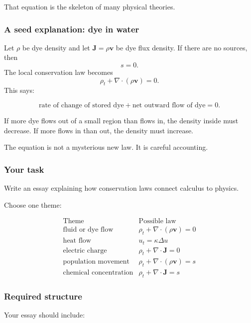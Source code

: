 That equation is the skeleton of many physical theories.

\subsubsection*{A seed explanation: dye in water}

Let \(\rho\) be dye density and let \(\mathbf J=\rho\mathbf v\) be dye flux density.
If there are no sources, then
\[
    s=0.
\]
The local conservation law becomes
\[
\boxed{
    \rho_t+\nabla\cdot(\rho\mathbf v)=0.
}
\]
This says:

\[
\text{rate of change of stored dye}
+
\text{net outward flow of dye}
=
0.
\]

If more dye flows out of a small region than flows in, the density inside must decrease.
If more flows in than out, the density must increase.

The equation is not a mysterious new law.  It is careful accounting.

\subsubsection*{Your task}

Write an essay explaining how conservation laws connect calculus to physics.

Choose one theme:

\[
\begin{array}{c|c}
\text{Theme} & \text{Possible law} \\ \hline
\text{fluid or dye flow} & \rho_t+\nabla\cdot(\rho\mathbf v)=0\\[1mm]
\text{heat flow} & u_t=\kappa\Delta u\\[1mm]
\text{electric charge} & \rho_t+\nabla\cdot\mathbf J=0\\[1mm]
\text{population movement} & \rho_t+\nabla\cdot(\rho\mathbf v)=s\\[1mm]
\text{chemical concentration} & \rho_t+\nabla\cdot\mathbf J=s
\end{array}
\]

\subsubsection*{Required structure}

Your essay should include:

